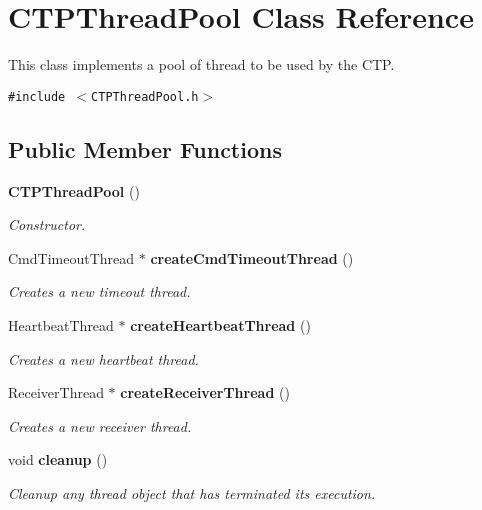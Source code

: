 \section{CTPThread\-Pool Class Reference}
\label{classCTPThreadPool}
This class implements a pool of thread to be used by the CTP.  


{\tt \#include $<$CTPThread\-Pool.h$>$}

\subsection*{Public Member Functions}
\begin{CompactItemize}
\item 
{\bf CTPThread\-Pool} ()\label{classCTPThreadPool_3ac6667a9ac6ab42221d9c84c6cb8c85}

\begin{CompactList}\small\item\em Constructor. \item\end{CompactList}\item 
Cmd\-Timeout\-Thread $\ast$ {\bf create\-Cmd\-Timeout\-Thread} ()\label{classCTPThreadPool_73e8f053eb0c3a7203fe17a75a1ff5fb}

\begin{CompactList}\small\item\em Creates a new timeout thread. \item\end{CompactList}\item 
Heartbeat\-Thread $\ast$ {\bf create\-Heartbeat\-Thread} ()\label{classCTPThreadPool_999e489fdb1e537938b622b336875374}

\begin{CompactList}\small\item\em Creates a new heartbeat thread. \item\end{CompactList}\item 
Receiver\-Thread $\ast$ {\bf create\-Receiver\-Thread} ()\label{classCTPThreadPool_d65c476cfbff1e31327c3baf728d7fa4}

\begin{CompactList}\small\item\em Creates a new receiver thread. \item\end{CompactList}\item 
void {\bf cleanup} ()\label{classCTPThreadPool_fdafcc67fcbf62e7e4b44169e5e146b2}

\begin{CompactList}\small\item\em Cleanup any thread object that has terminated its execution. \item\end{CompactList}\end{CompactItemize}


